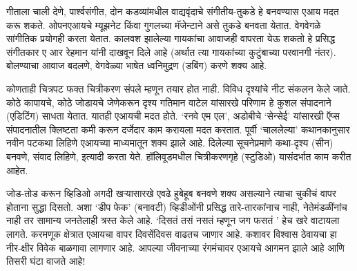 गीताला चाली देणे, पार्श्वसंगीत, दोन कडव्यांमधील वाद्यवृंदाचे संगीतीय-तुकडे हे बनवण्यास एआय मदत करू शकते. ओपनएआयचे म्यूझनेट किंवा गुगलच्या मॅजेन्टाने असे तुकडे बनवता येतात. वेगवेगळे सांगीतिक प्रयोगही करता येतात. कालवश झालेल्या गायकांचा आवाजही वापरता येऊ शकतो हे प्रसिद्ध संगीतकार ए आर रेहमान यांनी दाखवून दिले आहे (अर्थात त्या गायकांच्या कुटुंबाच्या परवानगी नंतर). बोलण्याचा आवाज बदलणे, वेगवेळ्या भाषेत ध्वनिमुद्रण (डबिंग) करणे शक्य आहे. 

कोणताही चित्रपट फक्त चित्रीकरण संपले म्हणून तयार होत नाही. विविध दृश्यांचे नीट संकलन केले जाते. कोठे कापायचे, कोठे जोडायचे जेणेकरून दृश्य गतिमान वाटेल यांसारखे परिणाम हे कुशल संपादनाने (एडिटिंग) साधता येतात. यातही एआयची मदत होते. `रनवे एम एल', अडोबीचे `सेन्सेई' यांसारखी ऍप्स संपादनातील क्लिष्टता कमी करून दर्जेदार काम करायला मदत करतात.  पूर्वी `चाललेल्या' कथानकानुसार नवीन पटकथा लिहिणे एआयच्या माध्यमातून शक्य झाले आहे. दिलेल्या सूचनेप्रमाणे कथा-दृश्य (सीन) बनवणे, संवाद लिहिणे, इत्यादी करता येते. हॉलिवूडमधील चित्रीकरणगृहे (स्टुडिओ) यासंदर्भात काम करीत आहेत. 

जोड-तोड करून व्हिडिओ अगदी खऱ्यासारखे एवढे हुबेहूब बनवणे शक्य असल्याने त्याचा चुकीचं वापर होताना सुद्धा दिसतो. अशा `डीप फेक' (बनावटी) व्हिडीओंनी प्रसिद्ध तारे-तारकांनाच नाही, नेतेमंडळींनांच नाही तर सामान्य जनतेलाही त्रस्त केले आहे. `दिसतं तसं नसतं म्हणून जग फसतं ' हेच खरे वाटायला लागते. करमणूक क्षेत्रात एआयचा वापर दिवसेंदिवस  वाढतच जाणार आहे. कशावर विश्वास ठेवायचा हा नीर-क्षीर विवेक बाळगावा लागणार आहे. आपल्या जीवनाच्या रंगमंचावर एआयचे आगमन झाले आहे आणि तिसरी घंटा वाजते आहे!
